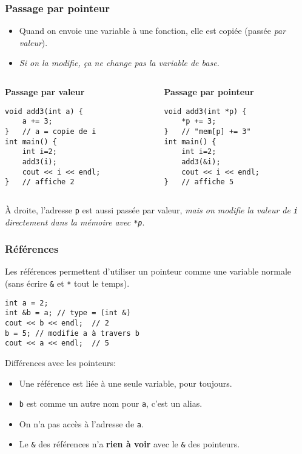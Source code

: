 \documentclass[12pt]{beamer}
\begin{document}
\begin{frame}[fragile]
\frametitle{Passage par pointeur}
\begin{itemize}
\item Quand on envoie une variable à une fonction, elle est copiée (passée \emph{par valeur}).
\item \emph{Si on la modifie, ça ne change pas la variable de base.}
\end{itemize}
\vspace{3pt}
\begin{columns}[T]
\begin{column}{.45\textwidth}
\textbf{Passage par valeur}
\begin{lstlisting}
void add3(int a) {
    a += 3;
}   // a = copie de i
int main() {
    int i=2;
    add3(i);
    cout << i << endl;
}   // affiche 2
\end{lstlisting}
\end{column}
\begin{column}{.45\textwidth}
\textbf{Passage par pointeur}
\begin{lstlisting}
void add3(int *p) {
    *p += 3;
}   // "mem[p] += 3"
int main() {
    int i=2;
    add3(&i);
    cout << i << endl;
}   // affiche 5
\end{lstlisting}
\end{column}
\end{columns}
\vspace{3pt}
À droite, l'adresse \lstinline|p| est aussi passée par valeur, \emph{mais on modifie la valeur de \lstinline|i| directement dans la mémoire avec \lstinline|*p|}.
\end{frame}

\begin{frame}[fragile]
\frametitle{Références}
Les références permettent d'utiliser un pointeur comme une variable normale (sans écrire \lstinline|&| et \lstinline|*| tout le temps).
\begin{lstlisting}
int a = 2;
int &b = a; // type = (int &)
cout << b << endl;  // 2
b = 5; // modifie a à travers b
cout << a << endl;  // 5
\end{lstlisting}
Différences avec les pointeurs:
\begin{itemize}
\item Une référence est liée à une seule variable, pour toujours.
\item \lstinline|b| est comme un autre nom pour \lstinline|a|, c'est un alias.
\item On n'a pas accès à l'adresse de \lstinline|a|.
\item Le \lstinline|&| des références n'a \textbf{rien à voir} avec le \lstinline|&| des pointeurs.
\end{itemize}
\end{frame}
\end{document}
